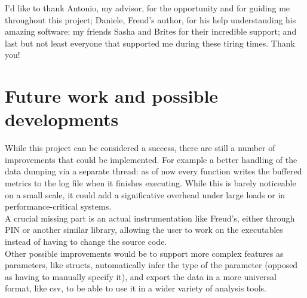     I'd like to thank Antonio, my advisor, for the opportunity and for guiding me throughout
    this project; Daniele, Freud's author, for his help understanding his amazing software;
    my friends Sasha and Brites for their incredible support;
    and last but not least everyone that supported me during these tiring times. Thank you!


	\section{Future work and possible developments}

        While this project can be considered a success, there are still a number of improvements
        that could be implemented. For example a better handling of the data dumping via a separate thread:
        as of now every function writes the buffered metrics to the log file when it finishes executing. While this
        is barely noticeable on a small scale, it could add a significative overhead under large loads
        or in performance-critical systems.\\

        A crucial missing part is an actual instrumentation like Freud's, either through PIN or another
        similar library, allowing the user to work on the executables instead of having to change the source code.\\

        Other possible improvements would be to support more complex features as parameters, like structs,
        automatically infer the type of the parameter (opposed as having to manually specify it), and
        export the data in a more universal format, like csv, to be able to use it in a wider variety of
        analysis tools.
